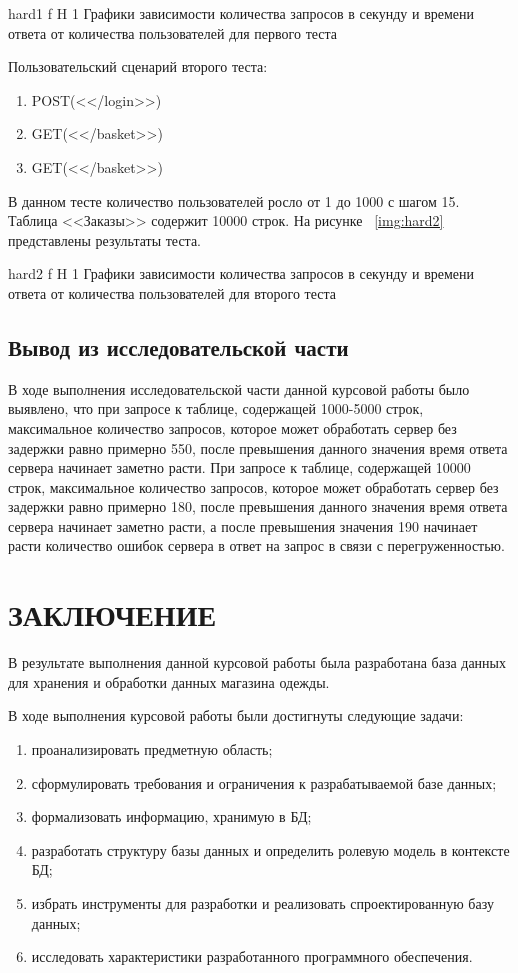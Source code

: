 \documentclass{bmstu}
\begin{document}
{hard1}
{f}
{H}
{1\textwidth}
{Графики зависимости количества запросов в секунду и времени ответа от количества пользователей для первого теста}

Пользовательский сценарий второго теста:

\begin{enumerate}
	\item[1)]
	POST(<</login>>)
	\item[2)]
	GET(<</basket>>)
	\item[3)]
	GET(<</basket>>)
\end{enumerate}

В данном тесте количество пользователей росло от 1 до 1000 с шагом 15. Таблица <<Заказы>> содержит 10000 строк. На рисунке ~\ref{img:hard2} представлены результаты теста.

{hard2}
{f}
{H}
{1\textwidth}
{Графики зависимости количества запросов в секунду и времени ответа от количества пользователей для второго теста}

\section*{Вывод из исследовательской части}

В ходе выполнения исследовательской части данной курсовой работы было выявлено, что при запросе к таблице, содержащей 1000-5000 строк, максимальное количество запросов, которое может обработать сервер без задержки равно примерно 550, после превышения данного значения время ответа сервера начинает заметно расти. При запросе к таблице, содержащей 10000 строк, максимальное количество запросов, которое может обработать сервер без задержки равно примерно 180, после превышения данного значения время ответа сервера начинает заметно расти, а после превышения значения 190 начинает расти количество ошибок сервера в ответ на запрос в связи с перегруженностью.

{\centering \chapter*{ЗАКЛЮЧЕНИЕ}}

В результате выполнения данной курсовой работы была разработана база данных для хранения и обработки данных магазина одежды.

В ходе выполнения курсовой работы были достигнуты следующие задачи:
\begin{enumerate}
	\item[1)] проанализировать предметную область;
	\item[2)] сформулировать требования и ограничения к разрабатываемой базе данных;
	\item[3)] формализовать информацию, хранимую в БД;
	\item[4)] разработать структуру базы данных и определить ролевую модель в контексте БД;
	\item[5)] избрать инструменты для разработки и реализовать спроектированную базу данных;
	\item[6)] исследовать характеристики разработанного программного обеспечения.
\end{enumerate}
\end{document}
